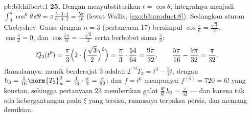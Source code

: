 \begin{solution}{pb:b3:hilbert:1}
\textbf{25.} Dengan menyubstitusikan $t = \cos\theta$, integralnya menjadi
$\int_0^\pi\cos^6\theta\,\dd\theta =
\pi\,\frac{5\cdot3\cdot1}{6\cdot4\cdot2} = \frac{5\pi}{16}$
(lewat Wallis, \cref{exo:b3:product:8}). Sedangkan aturan
Chebyshev--Gauss dengan $n = 3$ (pertanyaan 17) bersimpul
$\cos\frac\pi6 = \frac{\sqrt3}2$, $\cos\frac\pi2 = 0$, dan
$\cos\frac{5\pi}6 = -\frac{\sqrt3}2$ serta berbobot sama
$\frac\pi3$:
\[
Q_3(t^6) = \frac\pi3\Bigl(2\cdot\Bigl(\frac{\sqrt3}2
\Bigr)^{6}\Bigr) = \frac\pi3\cdot\frac{54}{64}
= \frac{9\pi}{32},
\qquad
\frac{5\pi}{16} - \frac{9\pi}{32} = \frac\pi{32} .
\]
Ramalannya:  monik berderajat $3$ adalah
$2^{-2}T_3 = t^3 - \frac34t$, dengan $h_3 =
\frac1{16}\norm{T_3}_w^2 = \frac1{16}\cdot\frac\pi2 =
\frac\pi{32}$; dan $f = t^6$ mempunyai $f^{(6)} = 720 =
6!$ yang konstan, sehingga pertanyaan 23 memberikan galat $\frac{6!}{6!}\,h_3 =
\frac\pi{32}$ --- dan karena tak ada kebergantungan pada $\xi$ yang tersisa,
rumusnya terpaksa persis, dan memang demikian.

\end{solution}
